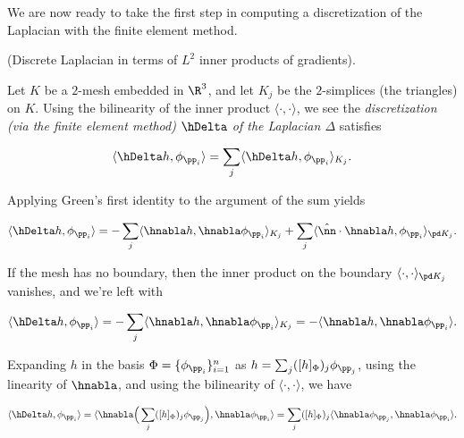 We are now ready to take the first step in computing a discretization of the Laplacian with the finite element method.

\begin{deriv}
\label{ch::ddg::deriv::discrete_laplacian_inner_prod_grad}
    (Discrete Laplacian in terms of $L^2$ inner products of gradients).
    
    Let $K$ be a $2$-mesh embedded in $\R^3$, and let $K_j$ be the $2$-simplices (the triangles) on $K$. Using the bilinearity of the inner product $\langle \cdot, \cdot \rangle$, we see the \textit{discretization (via the finite element method) $\hDelta$ of the Laplacian $\Delta$} satisfies

    \begin{align*}
        \langle \hDelta h, \phi_{\pp_i} \rangle 
        = \sum_j \langle \hDelta h, \phi_{\pp_i} \rangle_{K_j}.
    \end{align*}
    
    Applying Green's first identity to the argument of the sum yields
    
    \begin{align*}
        \langle \hDelta h, \phi_{\pp_i} \rangle = -\sum_j \langle \hnabla h, \hnabla \phi_{\pp_i} \rangle_{K_j} + \sum_j \langle \hat{\nn} \cdot \hnabla h, \phi_{\pp_i} \rangle_{\pd K_j}.
    \end{align*}
    
    If the mesh has no boundary, then the inner product on the boundary $\langle \cdot, \cdot \rangle_{\pd K_j}$ vanishes, and we're left with
    
    \begin{align*}
        \langle \hDelta h, \phi_{\pp_i} \rangle = -\sum_j \langle \hnabla h, \hnabla \phi_{\pp_i} \rangle_{K_j}
        = - \langle \hnabla h, \hnabla \phi_{\pp_i} \rangle.
    \end{align*}
    
    Expanding $h$ in the basis $\Phi = \{\phi_{\pp_i}\}_{i = 1}^n$ as $h = \sum_j ([h]_\Phi)_j \phi_{\pp_j}$, using the linearity of $\hnabla$, and using the bilinearity of $\langle \cdot, \cdot \rangle$, we have
    
    \begin{align*}
         \langle \hDelta h, \phi_{\pp_i} \rangle =
         \langle \hnabla \Big( \sum_j ([h]_\Phi)_j \phi_{\pp_j} \Big), \hnabla \phi_{\pp_i} \rangle
         = \sum_j ([h]_\Phi)_j \langle \hnabla \phi_{\pp_j}, \hnabla \phi_{\pp_i} \rangle.
    \end{align*}
\end{deriv}

